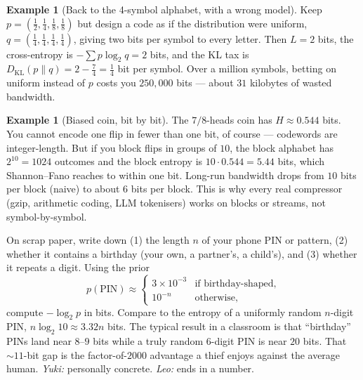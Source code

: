 \documentclass[12pt,a4paper]{article}
\theoremstyle{plain}
\theoremstyle{definition}
\newtheorem{example}[theorem]{Example}
\begin{document}
\begin{example}[Back to the 4-symbol alphabet, with a wrong model]
\label{ex:h4-wrong}
Keep $p = (\tfrac12, \tfrac14, \tfrac18, \tfrac18)$ but design a code
as if the distribution were uniform, $q = (\tfrac14, \tfrac14,
\tfrac14, \tfrac14)$, giving two bits per symbol to every letter.
Then $L = 2$ bits, the cross-entropy is $-\sum p \log_2 q = 2$ bits,
and the KL tax is $D_{\mathrm{KL}}(p\|q) = 2 - \tfrac74 = \tfrac14$
bit per symbol. Over a million symbols, betting on uniform instead
of $p$ costs you $250{,}000$ bits --- about $31$ kilobytes of
wasted bandwidth.
\end{example}

\begin{example}[Biased coin, bit by bit]
\label{ex:biased-coin}
The $7/8$-heads coin has $H \approx 0.544$ bits. You cannot encode
one flip in fewer than one bit, of course --- codewords are
integer-length. But if you block flips in groups of $10$, the
block alphabet has $2^{10} = 1024$ outcomes and the block entropy
is $10\cdot 0.544 = 5.44$ bits, which Shannon--Fano reaches to
within one bit. Long-run bandwidth drops from $10$ bits per block
(naive) to about $6$ bits per block. This is why every real
compressor (gzip, arithmetic coding, LLM tokenisers) works on
blocks or streams, not symbol-by-symbol.
\end{example}

\begin{activity}[title={Entropy of your phone lock-screen --- 5 minutes}]
\label{act:pin}
On scrap paper, write down (1) the length $n$ of your phone PIN or
pattern, (2) whether it contains a birthday (your own, a partner's,
a child's), and (3) whether it repeats a digit. Using the prior
\[
  p(\text{PIN}) \approx
  \begin{cases}
    3\times 10^{-3} & \text{if birthday-shaped}, \\
    10^{-n}          & \text{otherwise},
  \end{cases}
\]
compute $-\log_2 p$ in bits. Compare to the entropy of a uniformly
random $n$-digit PIN, $n \log_2 10 \approx 3.32 n$ bits. The typical
result in a classroom is that ``birthday'' PINs land near $8$--$9$
bits while a truly random 6-digit PIN is near $20$ bits. That
$\sim 11$-bit gap is the factor-of-$2000$ advantage a thief enjoys
against the average human.
\textit{Yuki:} personally concrete. \textit{Leo:} ends in a number.
\end{activity}
\end{document}
